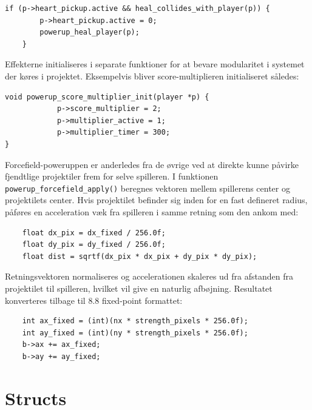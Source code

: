 \begin{lstlisting} 
if (p->heart_pickup.active && heal_collides_with_player(p)) {
        p->heart_pickup.active = 0;
        powerup_heal_player(p);
    }
\end{lstlisting}
\vspace{-2em}

Effekterne initialiseres i separate funktioner for at bevare modularitet i systemet der køres i projektet. Eksempelvis bliver score-multiplieren initialiseret således:\\

\begin{lstlisting} 
void powerup_score_multiplier_init(player *p) {
            p->score_multiplier = 2;
            p->multiplier_active = 1;
            p->multiplier_timer = 300;
}
\end{lstlisting}
\vspace{-2em}

Forcefield-poweruppen er anderledes fra de øvrige ved at direkte kunne påvirke fjendtlige projektiler frem for selve spilleren. I funktionen \texttt{powerup\_forcefield\_apply()} beregnes vektoren mellem spillerens center og projektilets center. Hvis projektilet befinder sig inden for en fast defineret radius, påføres en acceleration væk fra spilleren i samme retning som den ankom med:\\

\begin{lstlisting} 
    float dx_pix = dx_fixed / 256.0f;
    float dy_pix = dy_fixed / 256.0f;
    float dist = sqrtf(dx_pix * dx_pix + dy_pix * dy_pix);
\end{lstlisting}
\vspace{-2em}

Retningsvektoren normaliseres og accelerationen skaleres ud fra afstanden fra projektilet til spilleren, hvilket vil give en naturlig afbøjning.
Resultatet konverteres tilbage til 8.8 fixed-point formattet:\\

\begin{lstlisting} 
    int ax_fixed = (int)(nx * strength_pixels * 256.0f);
    int ay_fixed = (int)(ny * strength_pixels * 256.0f);
    b->ax += ax_fixed;
    b->ay += ay_fixed;
\end{lstlisting}
\vspace{-2em}



\section{Structs}
\vspace{0.5em}

